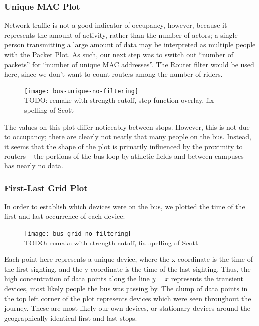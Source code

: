 \documentclass[letterpaper,abstract=on,titlepage=false]{scrreprt}
\begin{document}
	\subsubsection*{Unique MAC Plot}

		Network traffic is not a good indicator of occupancy, however, because it represents the amount of activity, rather than the number of actors; a single person transmitting a large amount of data may be interpreted as multiple people with the Packet Plot.
		As such, our next step was to switch out ``number of packets'' for ``number of unique MAC addresses''.
		The Router filter would be used here, since we don't want to count routers among the number of riders.

		\begin{figure}[H]
		\texttt{[image: bus-unique-no-filtering]}
		\\TODO: remake with strength cutoff, step function overlay, fix spelling of Scott
		\centering
		\end{figure}

		The values on this plot differ noticeably between stops.
		However, this is not due to occupancy; there are clearly not nearly that many people on the bus.
		Instead, it seems that the shape of the plot is primarily influenced by the proximity to routers -- the portions of the bus loop by athletic fields and between campuses has nearly no data.

	\subsubsection*{First-Last Grid Plot}
		In order to establish which devices were on the bus, we plotted the time of the first and last occurrence of each device:

		\begin{figure}[H]
		\texttt{[image: bus-grid-no-filtering]}
		\\TODO: remake with strength cutoff, fix spelling of Scott
		\centering
		\end{figure}

		Each point here represents a unique device, where the x-coordinate is the time of the first sighting, and the y-coordinate is the time of the last sighting.
		Thus, the high concentration of data points along the line \(y=x\) represents the transient devices, most likely people the bus was passing by.
		The clump of data points in the top left corner of the plot represents devices which were seen throughout the journey.
		These are most likely our own devices, or stationary devices around the geographically identical first and last stops.
\end{document}
